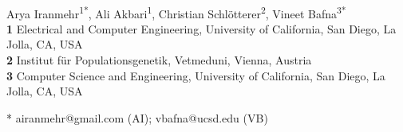\documentclass[10pt,letterpaper]{article}
\date{}
\renewcommand{\figurename}{Fig}
\begin{document}
\vspace*{0.2in}

\begin{flushleft}
{\Large
\textbf{}
}
\newline
\\
Arya Iranmehr\textsuperscript{1*},
Ali Akbari\textsuperscript{1},
Christian Schl\"{o}tterer\textsuperscript{2},
Vineet Bafna\textsuperscript{3*}
\\
\bigskip
\textbf{1} Electrical and Computer Engineering, University of California, San 
Diego, La Jolla, CA, USA
\\
\textbf{2} Institut f\"{u}r Populationsgenetik, Vetmeduni, Vienna, Austria
\\
\textbf{3} Computer Science and Engineering, University of California, San 
Diego, La Jolla, CA, USA
\\
\bigskip


* airanmehr@gmail.com (AI); vbafna@ucsd.edu (VB)

\end{flushleft}

\setcounter{figure}{0}
\setcounter{table}{0}
\setcounter{equation}{0}
\setcounter{section}{0}
\renewcommand{\figurename}{}
\renewcommand{\tablename}{}
\renewcommand{\thefigure}{S\arabic{figure}~Fig}
\renewcommand{\thetable}{S\arabic{table}~Table}
\renewcommand{\theequation}{S\arabic{equation}}
\renewcommand{\thesection}{S\arabic{section}~Text} 
\renewcommand{\thesubsection}{S\arabic{section}.\arabic{subsection}~Text} 



\linenumbers




\nolinenumbers
\end{document}
